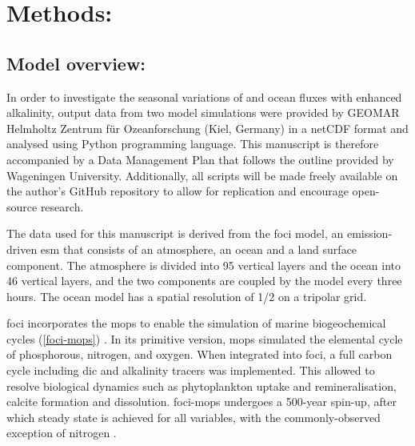 \chapter{Methods:}

\section{Model overview:}

In order to investigate the seasonal variations of  and ocean  fluxes with enhanced alkalinity, output data from two model simulations were provided by GEOMAR Helmholtz Zentrum für Ozeanforschung (Kiel, Germany) in a netCDF format and analysed using Python programming language. This manuscript is therefore accompanied by a Data Management Plan that follows the outline provided by Wageningen University. Additionally, all scripts will be made freely available on the author's GitHub repository to allow for replication and encourage open-source research. 

The data used for this manuscript is derived from the \ac{foci} model, an emission-driven \ac{esm} that consists of an atmosphere, an ocean and a land surface component. The atmosphere is divided into 95 vertical layers and the ocean into 46 vertical layers, and the two components are coupled by the model every three hours. The ocean model has a spatial resolution of 1/2\textdegree{} on a tripolar grid. 

\ac{foci} incorporates the \ac{mops} to enable the simulation of marine biogeochemical cycles (\cref{foci-mops}) \citep{chien2022foci}. In its primitive version, \ac{mops} simulated the elemental cycle of phosphorous, nitrogen, and oxygen. When integrated into \ac{foci}, a full carbon cycle including \ac{dic} and alkalinity tracers was implemented. This allowed to resolve biological dynamics such as phytoplankton uptake and remineralisation, calcite formation and dissolution. \ac{foci}-\ac{mops} undergoes a 500-year spin-up, after which steady state is achieved for all variables, with the commonly-observed exception of nitrogen \citep{chien2022foci}.

